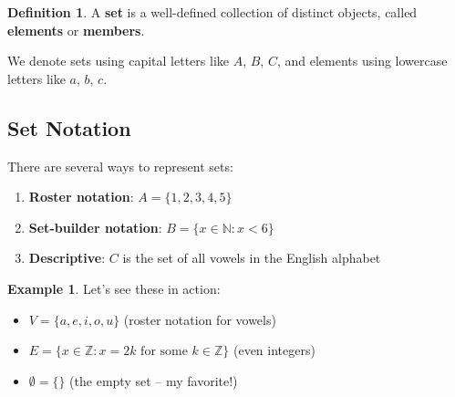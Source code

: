 \documentclass[11pt,a4paper]{article}
\newcommand{\N}{\mathbb{N}}
\newcommand{\Z}{\mathbb{Z}}
\theoremstyle{definition}
\newtheorem{definition}{Definition}[section]
\newtheorem{example}{Example}[section]
\begin{document}
\begin{definition}
A \textbf{set} is a well-defined collection of distinct objects, called \textbf{elements} or \textbf{members}.
\end{definition}

We denote sets using capital letters like $A$, $B$, $C$, and elements using lowercase letters like $a$, $b$, $c$.

\begin{center}
\end{center}

\subsection{Set Notation}

There are several ways to represent sets:

\begin{enumerate}
    \item \textbf{Roster notation}: $A = \{1, 2, 3, 4, 5\}$
    \item \textbf{Set-builder notation}: $B = \{x \in \N : x < 6\}$
    \item \textbf{Descriptive}: $C$ is the set of all vowels in the English alphabet
\end{enumerate}

\begin{example}
Let's see these in action:
\begin{itemize}
    \item $V = \{a, e, i, o, u\}$ (roster notation for vowels)
    \item $E = \{x \in \Z : x = 2k \text{ for some } k \in \Z\}$ (even integers)
    \item $\emptyset = \{\}$ (the empty set -- my favorite!)
\end{itemize}
\end{example}
\end{document}
